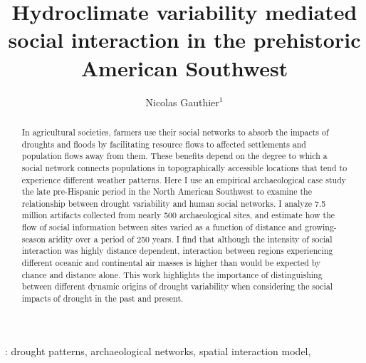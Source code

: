 \documentclass[10pt]{iopart}
\begin{document}
\title{Hydroclimate variability mediated social interaction in the prehistoric American Southwest}

\author{Nicolas Gauthier$^1$}

\address{$^1$ School of Human Evolution and Social Change, 900 S Cady Mall, Tempe, USA}


\begin{abstract}
  In agricultural societies, farmers use their social networks to absorb the impacts of droughts and floods by facilitating resource flows to affected settlements and population flows away from them. These benefits depend on the degree to which a social network connects populations in topographically accessible locations that tend to experience different weather patterns. Here I use an empirical archaeological case study the late pre-Hispanic period in the North American Southwest to examine the relationship between drought variability and human social networks. I analyze 7.5 million artifacts collected from nearly 500 archaeological sites, and estimate how the flow of social information between sites varied as a function of distance and growing-season aridity over a period of 250 years. I find that although the intensity of social interaction was highly distance dependent, interaction between regions experiencing different oceanic and continental air masses is higher than would be expected by chance and distance alone. This work highlights the importance of distinguishing between different dynamic origins of drought variability when considering the social impacts of drought in the past and present.
\end{abstract}

: drought patterns, archaeological networks, spatial interaction model, 

\maketitle

\end{document}
